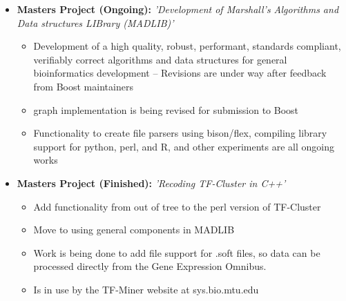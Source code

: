 \documentclass[11pt,a4paper,sans]{moderncv}        %
\begin{document}
\begin{itemize}

\item{\textbf{Masters Project (Ongoing):} \textit{'Development of Marshall's Algorithms and Data structures LIBrary (MADLIB)'}

\vspace{3pt}

\small{
\begin{itemize}
\item Development of a high quality, robust, performant, standards compliant, verifiably correct algorithms and data structures for general bioinformatics development -- Revisions are under way after feedback from Boost maintainers
\item graph implementation is being revised for submission to Boost
\item Functionality to create file parsers using bison/flex, compiling library support for python, perl, and R, and other experiments are all ongoing works
\end{itemize}
}
}

\vspace{6pt}

\item{\textbf{Masters Project (Finished):} \textit{'Recoding TF-Cluster in C++'}

\vspace{3pt}

\small{
\begin{itemize}
\item Add functionality from out of tree to the perl version of TF-Cluster
\item Move to using general components in MADLIB
\item Work is being done to add file support for .soft files, so data can be processed directly from the Gene Expression Omnibus.
\item Is in use by the TF-Miner website at sys.bio.mtu.edu
\end{itemize}
}}

\end{itemize}

\vspace{2pt}

%
%
%
%
\end{document}
